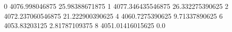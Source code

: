 0 4076.998046875 25.98388671875
1 4077.346435546875 26.332275390625
2 4072.237060546875 21.222900390625
4 4060.7275390625 9.71337890625
6 4053.83203125 2.81787109375
8 4051.01416015625 0.0
